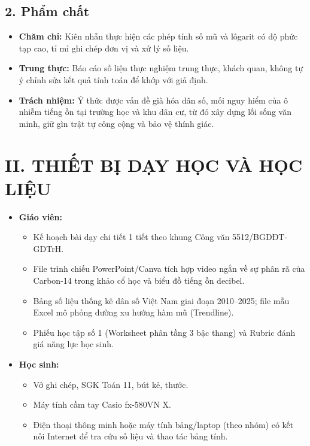 \documentclass[12pt, a4paper]{article}
\begin{document}
\subsection*{2. Phẩm chất}

\begin{itemize}[leftmargin=1.2cm]
    \item \textbf{Chăm chỉ:} Kiên nhẫn thực hiện các phép tính số mũ và lôgarit có độ phức tạp cao, tỉ mỉ ghi chép đơn vị và xử lý số liệu.
    \item \textbf{Trung thực:} Báo cáo số liệu thực nghiệm trung thực, khách quan, không tự ý chỉnh sửa kết quả tính toán để khớp với giả định.
    \item \textbf{Trách nhiệm:} Ý thức được vấn đề già hóa dân số, mối nguy hiểm của ô nhiễm tiếng ồn tại trường học và khu dân cư, từ đó xây dựng lối sống văn minh, giữ gìn trật tự công cộng và bảo vệ thính giác.
\end{itemize}

\section*{II. THIẾT BỊ DẠY HỌC VÀ HỌC LIỆU}

\begin{itemize}[leftmargin=1.2cm]
    \item \textbf{Giáo viên:}
    \begin{itemize}[leftmargin=0.6cm]
        \item Kế hoạch bài dạy chi tiết 1 tiết theo khung Công văn 5512/BGDĐT-GDTrH.
        \item File trình chiếu PowerPoint/Canva tích hợp video ngắn về sự phân rã của Carbon-14 trong khảo cổ học và biểu đồ tiếng ồn decibel.
        \item Bảng số liệu thống kê dân số Việt Nam giai đoạn 2010--2025; file mẫu Excel mô phỏng đường xu hướng hàm mũ (Trendline).
        \item Phiếu học tập số 1 (Worksheet phân tầng 3 bậc thang) và Rubric đánh giá năng lực học sinh.
    \end{itemize}
    \item \textbf{Học sinh:}
    \begin{itemize}[leftmargin=0.6cm]
        \item Vở ghi chép, SGK Toán 11, bút kẻ, thước.
        \item Máy tính cầm tay Casio fx-580VN X.
        \item Điện thoại thông minh hoặc máy tính bảng/laptop (theo nhóm) có kết nối Internet để tra cứu số liệu và thao tác bảng tính.
    \end{itemize}
\end{itemize}
\end{document}
